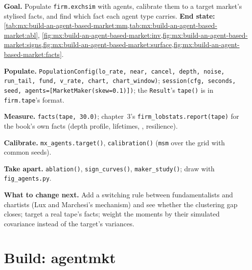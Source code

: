 \begin{tutorial}
\textbf{Goal.} Populate \texttt{firm.exchsim} with agents, calibrate them to a target market's stylised facts, and find which fact each agent type
carries. \textbf{End state:} \cref{tab:mx:build-an-agent-based-market:mm,tab:mx:build-an-agent-based-market:abl},
\cref{fig:mx:build-an-agent-based-market:inv,fig:mx:build-an-agent-based-market:signs,fig:mx:build-an-agent-based-market:surface,fig:mx:build-an-agent-based-market:facts}.
\begin{tutsteps}
\item \textbf{Populate.} \texttt{PopulationConfig(lo\_rate, near, cancel, depth, noise, run\_tail, fund, v\_rate, chart, chart\_window)};
\texttt{session(cfg, seconds, seed, agents=[MarketMaker(skew=0.1)])}; the \texttt{Result}'s \texttt{tape()} is in \texttt{firm.tape}'s format.
\item \textbf{Measure.} \texttt{facts(tape, 30.0)}; chapter~3's \texttt{firm\_lobstats.report(tape)} for the book's own facts (depth profile,
lifetimes, , resilience).
\item \textbf{Calibrate.} \texttt{mx\_agents.target()}, \texttt{calibration()} (\texttt{msm} over the grid with common seeds).
\item \textbf{Take apart.} \texttt{ablation()}, \texttt{sign\_curves()}, \texttt{maker\_study()}; draw with \texttt{fig\_agents.py}.
\end{tutsteps}
\textbf{What to change next.} Add a switching rule between fundamentalists and chartists (Lux and Marchesi's mechanism) and see whether the clustering
gap closes; target a real tape's facts; weight the moments by their simulated covariance instead of the target's variances.
\end{tutorial}

\section{Build: agentmkt}\label{bld:mx:build-an-agent-based-market:agentmkt}

